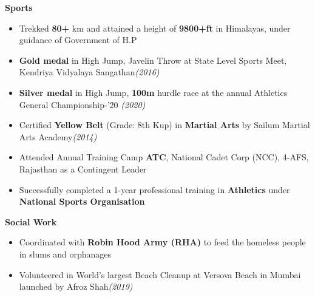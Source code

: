 \documentclass[10.5pt]{article}
\begin{document}
		\vspace{-7pt}
		\textbf{Sports}\\
\vspace{-10pt}
    \begin{itemize}[itemsep = -0.3mm,leftmargin=*]
    \vspace{-5pt}
    \item Trekked \textbf{80+} km and attained a height of \textbf{9800+ft} in Himalayas, under guidance of Government of H.P
    
    \item \textbf{Gold medal} in High Jump, Javelin Throw at State Level Sports Meet, Kendriya Vidyalaya Sangathan\hfill{\sl\small(2016)}
    
    \item \textbf{Silver medal} in High Jump, \textbf{100m} hurdle race at the annual Athletics General Championship-'20 \hfill{\sl\small(2020)}
        
    \item Certified \textbf{Yellow Belt} (Grade: 8th Kup) in \textbf{Martial Arts} by Sailum Martial Arts Academy\hfill{\sl\small{(2014)}}       
                            
    \item Attended Annual Training Camp \textbf{ATC}, National Cadet Corp (NCC), 4-AFS, Rajasthan as a Contingent Leader
    
    \item Successfully completed a 1-year professional training in \textbf{Athletics} under \textbf{National Sports Organisation}
    
    \end{itemize}
    
    \vspace{-4pt}
    \hspace{-19pt}
    \textbf{Social Work}
    
    \begin{itemize}[itemsep = -.5mm, leftmargin=*]
    \vspace{-5pt}
    \item Coordinated with \textbf{Robin Hood Army (RHA)} to feed the homeless people in slums and orphanages
    
    \item Volunteered in World's largest Beach Cleanup at Versova Beach in Mumbai launched by Afroz Shah\hfill{\sl\small(2019)}
 \end{itemize}
\end{document}
